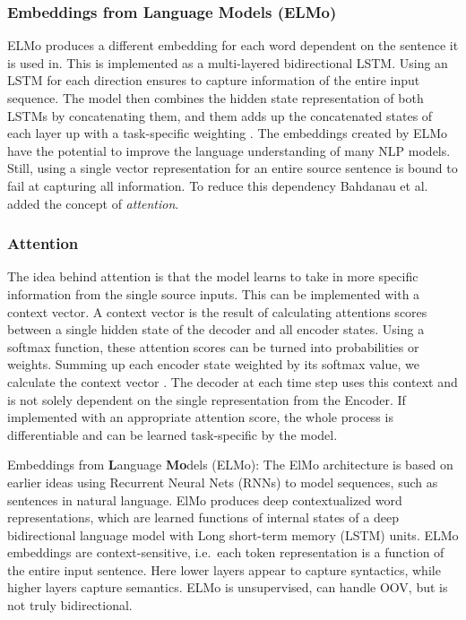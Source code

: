 \documentclass[11pt, a4paper]{amsart}
\begin{document}
\subsubsection{Embeddings from Language Models (ELMo)}
ELMo produces a different embedding for each word dependent on the sentence it is used in. This is implemented as a multi-layered bidirectional LSTM. Using an LSTM for each direction ensures to capture information of the entire input sequence. The model then combines the hidden state representation of both LSTMs by concatenating them, and them adds up the concatenated states of each layer up with a task-specific weighting \cite{DBLP:conf/naacl/PetersNIGCLZ18}.  The embeddings created by ELMo have the potential to improve the language understanding of many NLP models. Still, using a single vector representation for an entire source sentence is bound to fail at capturing all information. 
To reduce this dependency Bahdanau et al. added the concept of \emph{attention}.

\subsubsection{Attention}

The idea behind attention is that the model learns to take in more specific information from the single source inputs. 
This can be implemented with a context vector. 
A context vector is the result of calculating attentions scores between a single hidden state of the decoder and all encoder states. 
Using a softmax function, these attention scores can be turned into probabilities or weights. 
Summing up each encoder state weighted by its softmax value, we calculate the context vector \cite{DBLP:journals/corr/BahdanauCB14}.
The decoder at each time step uses this context and is not solely dependent on the single representation from the Encoder. 
If implemented with an appropriate attention score, the whole process is differentiable and can be learned task-specific by the model.

{
\color{blue}

{E}mbeddings from \textbf{L}anguage \textbf{Mo}dels (ELMo):
The ElMo architecture is based on earlier ideas using Recurrent Neural Nets (RNNs) to model sequences, such as sentences in natural language.
ElMo produces deep contextualized word representations, which are learned functions of internal states of a deep bidirectional language model with Long short-term memory (LSTM) units.
ELMo embeddings are context-sensitive, i.e.\ each token representation is a function of the entire input sentence.
Here lower layers appear to capture syntactics, while higher layers capture semantics.
ELMo is unsupervised, can handle OOV, but is not truly bidirectional.
} %
\end{document}

